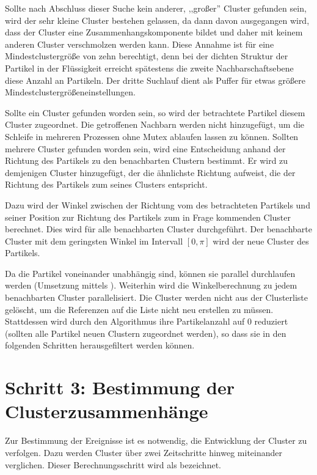 Sollte nach Abschluss dieser Suche kein anderer, ,,großer'' Cluster gefunden sein, wird der sehr kleine Cluster bestehen gelassen, da dann davon ausgegangen wird, dass der Cluster eine Zusammenhangskomponente bildet und daher mit keinem anderen Cluster verschmolzen werden kann. Diese Annahme ist für eine Mindestclustergröße von zehn berechtigt, denn bei der dichten Struktur der Partikel in der Flüssigkeit erreicht spätestens die zweite Nachbarschaftsebene diese Anzahl an Partikeln. Der dritte Suchlauf dient als Puffer für etwas größere Mindestclustergrößeneinstellungen.

Sollte ein Cluster gefunden worden sein, so wird der betrachtete Partikel diesem Cluster zugeordnet. Die getroffenen Nachbarn werden nicht hinzugefügt, um die Schleife in mehreren Prozessen ohne Mutex ablaufen lassen zu können. Sollten mehrere Cluster gefunden worden sein, wird eine Entscheidung anhand der Richtung des Partikels zu den benachbarten Clustern bestimmt. Er wird zu demjenigen Cluster hinzugefügt, der die ähnlichste Richtung aufweist, die der Richtung des Partikels zum  seines Clusters entspricht.

Dazu wird der Winkel zwischen der Richtung vom  des betrachteten Partikels und seiner Position zur Richtung des Partikels zum in Frage kommenden Cluster berechnet. Dies wird für alle benachbarten Cluster durchgeführt. Der benachbarte Cluster mit dem geringsten Winkel im Intervall $[0, \pi]$ wird der neue Cluster des Partikels.

Da die Partikel voneinander unabhängig sind, können sie parallel durchlaufen werden (Umsetzung mittels ). Weiterhin wird die Winkelberechnung zu jedem benachbarten Cluster parallelisiert.
Die Cluster werden nicht aus der Clusterliste gelöscht, um die Referenzen auf die Liste nicht neu erstellen zu müssen. Stattdessen wird durch den Algorithmus ihre Partikelanzahl auf 0 reduziert (sollten alle Partikel neuen Clustern zugeordnet werden), so dass sie in den folgenden Schritten herausgefiltert werden können.

\section{Schritt 3: Bestimmung der Clusterzusammenhänge}\label{sec:clusterzusammenhaenge}
Zur Bestimmung der Ereignisse ist es notwendig, die Entwicklung der Cluster zu verfolgen. Dazu werden Cluster über zwei Zeitschritte hinweg miteinander verglichen. Dieser Berechnungsschritt wird als \SECC bezeichnet.

